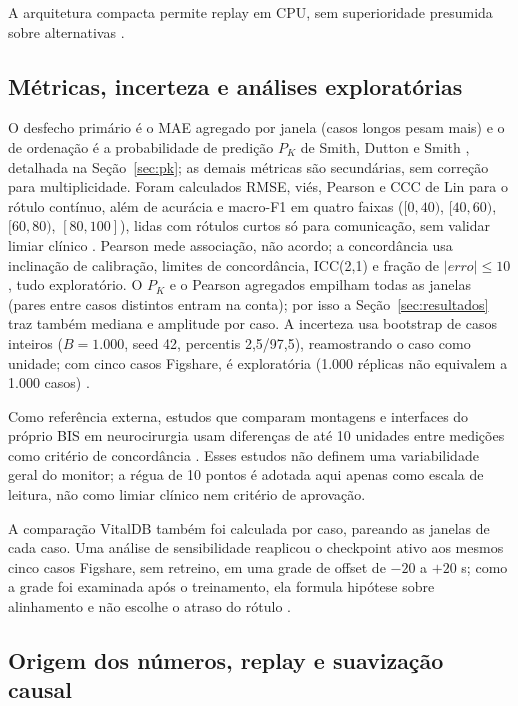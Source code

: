 \documentclass[12pt]{article}
\begin{document}
A arquitetura compacta permite replay em CPU, sem superioridade presumida sobre alternativas \cite{park2020,shi2023}.

\subsection{Métricas, incerteza e análises exploratórias}

O desfecho primário é o MAE agregado por janela (casos longos pesam mais) e o de ordenação é a probabilidade de predição $P_K$ de Smith, Dutton e Smith \cite{smith1996}, detalhada na Seção~\ref{sec:pk}; as demais métricas são secundárias, sem correção para multiplicidade. Foram calculados RMSE, viés, Pearson e CCC de Lin para o rótulo contínuo, além de acurácia e macro-F1 em quatro faixas ($[0,40)$, $[40,60)$, $[60,80)$, $[80,100]$), lidas com rótulos curtos só para comunicação, sem validar limiar clínico \cite{tripodai}. Pearson mede associação, não acordo; a concordância usa inclinação de calibração, limites de concordância, ICC(2,1) e fração de $|erro|\leq10$, tudo exploratório. O $P_K$ e o Pearson agregados empilham todas as janelas (pares entre casos distintos entram na conta); por isso a Seção~\ref{sec:resultados} traz também mediana e amplitude por caso. A incerteza usa bootstrap de casos inteiros ($B=1.000$, seed 42, percentis 2,5/97,5), reamostrando o caso como unidade; com cinco casos Figshare, é exploratória (1.000 réplicas não equivalem a 1.000 casos) \cite{field2007,archer2021}.

Como referência externa, estudos que comparam montagens e interfaces do próprio BIS em neurocirurgia usam diferenças de até 10 unidades entre medições como critério de concordância \cite{dahaba2010,shiraishi2004,harada2021}. Esses estudos não definem uma variabilidade geral do monitor; a régua de 10 pontos é adotada aqui apenas como escala de leitura, não como limiar clínico nem critério de aprovação.

A comparação VitalDB também foi calculada por caso, pareando as janelas de cada caso. Uma análise de sensibilidade reaplicou o checkpoint ativo aos mesmos cinco casos Figshare, sem retreino, em uma grade de offset de $-20$ a $+20$ s; como a grade foi examinada após o treinamento, ela formula hipótese sobre alinhamento e não escolhe o atraso do rótulo \cite{pilge2006}.

\subsection{Origem dos números, replay e suavização causal}
\label{sec:replay}
\end{document}
